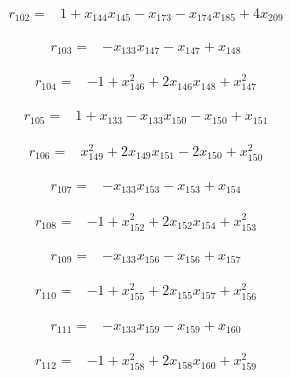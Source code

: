 \begin{align*}
r_{102}={}&1+x_{144}x_{145}-x_{173}-x_{174}x_{185}+4x_{209}
\end{align*}

\begin{align*}
r_{103}={}&-x_{133}x_{147}-x_{147}+x_{148}
\end{align*}

\begin{align*}
r_{104}={}&-1+x_{146}^{2}+2x_{146}x_{148}+x_{147}^{2}
\end{align*}

\begin{align*}
r_{105}={}&1+x_{133}-x_{133}x_{150}-x_{150}+x_{151}
\end{align*}

\begin{align*}
r_{106}={}&x_{149}^{2}+2x_{149}x_{151}-2x_{150}+x_{150}^{2}
\end{align*}

\begin{align*}
r_{107}={}&-x_{133}x_{153}-x_{153}+x_{154}
\end{align*}

\begin{align*}
r_{108}={}&-1+x_{152}^{2}+2x_{152}x_{154}+x_{153}^{2}
\end{align*}

\begin{align*}
r_{109}={}&-x_{133}x_{156}-x_{156}+x_{157}
\end{align*}

\begin{align*}
r_{110}={}&-1+x_{155}^{2}+2x_{155}x_{157}+x_{156}^{2}
\end{align*}

\begin{align*}
r_{111}={}&-x_{133}x_{159}-x_{159}+x_{160}
\end{align*}

\begin{align*}
r_{112}={}&-1+x_{158}^{2}+2x_{158}x_{160}+x_{159}^{2}
\end{align*}

